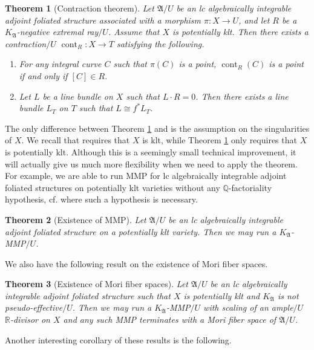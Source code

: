 \documentclass[12pt]{amsart}
\numberwithin{equation}{section}
\newcommand{\Rr}{\mathbb{R}}
\newcommand{\cont}{\operatorname{cont}}
\newcommand{\Aa}{{\mathfrak{A}}}
\newtheorem{thmsub}{Theorem}[subsection]
\theoremstyle{definition}
\theoremstyle{definition}
\theoremstyle{definition}
\begin{document}
\begin{thmsub}[Contraction theorem]\label{thm: cont intro}
Let $\Aa/U$ be an lc algebraically integrable adjoint foliated structure associated with a morphism $\pi\colon X\rightarrow U$, and let $R$ be a $K_{\Aa}$-negative extremal ray$/U$. Assume that $X$ is potentially klt. Then there exists a contraction$/U$ $\cont_R\colon X\rightarrow T$ satisfying the following.
    \begin{enumerate}
        \item For any integral curve $C$ such that $\pi(C)$ is a point, $\cont_R(C)$ is a point if and only if $[C]\in R$.
        \item Let $L$ be a line bundle on $X$ such that $L\cdot R=0$. Then there exists a line bundle $L_T$ on $T$ such that $L\cong f^\ast L_T$.
    \end{enumerate}
\end{thmsub}
The only difference between  Theorem \ref{thm: cont intro} and \cite[Theorem 1.4]{CHLMSSX24} is the assumption on the singularities of $X$.  We recall that \cite[Theorem 1.4]{CHLMSSX24} requires that $X$ is klt, while Theorem \ref{thm: cont intro} only requires that $X$ is potentially klt. Although this is a seemingly small technical improvement, it will actually give us much more flexibility when we need to apply the theorem. For example, we are able to run MMP for lc algebraically integrable adjoint foliated structures on potentially klt varieties without any $\mathbb Q$-factoriality hypothesis, cf. \cite[Theorem 1.6]{CHLMSSX24} where such a hypothesis is necessary.
\begin{thmsub}[Existence of MMP]\label{thm: mmp potentially klt ambient algint afs}
Let $\Aa/U$ be an lc algebraically integrable adjoint foliated structure on a potentially klt variety. Then we may run a $K_{\Aa}$-MMP$/U$.
\end{thmsub}


We also have the following result on the existence of Mori fiber spaces.

\begin{thmsub}[Existence of Mori fiber spaces]\label{thm: eomfs ai afs}
 Let $\Aa/U$ be an lc algebraically integrable adjoint foliated structure such that $X$ is potentially klt and $K_{\Aa}$ is not pseudo-effective$/U$. Then we may run a $K_{\Aa}$-MMP$/U$ with scaling of an ample$/U$ $\Rr$-divisor on $X$ and any such MMP terminates with a Mori fiber space of $\Aa/U$.
\end{thmsub}

Another interesting corollary of these results is the following.
\end{document}
